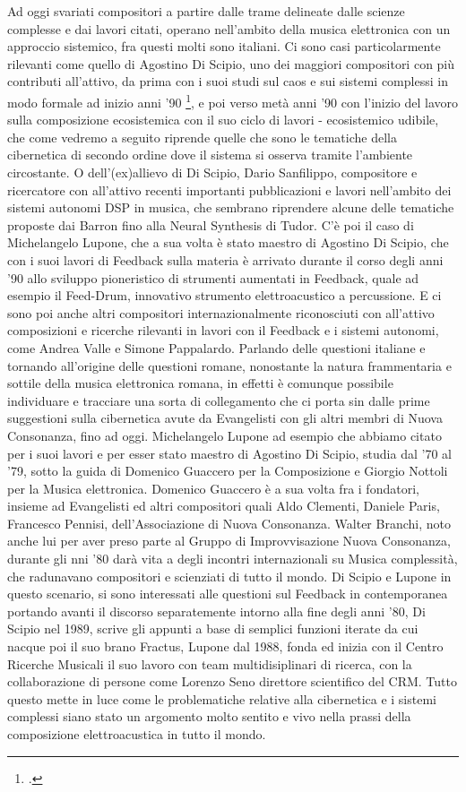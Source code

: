 Ad oggi svariati compositori a partire dalle trame delineate dalle scienze complesse e
dai lavori citati, operano nell'ambito della musica elettronica con un approccio sistemico,
fra questi molti sono italiani.
Ci sono casi particolarmente rilevanti come quello di Agostino Di Scipio,
uno dei maggiori compositori con più contributi all'attivo,
da prima con i suoi studi sul caos e sui sistemi complessi in modo formale ad inizio
anni '90 \footcite{discipioiterated},
e poi verso metà anni '90 con l'inizio del lavoro sulla composizione ecosistemica
con il suo ciclo di lavori
- ecosistemico udibile, che come vedremo a seguito riprende
quelle che sono le tematiche della cibernetica di secondo ordine dove
il sistema si osserva tramite l'ambiente circostante.
O dell'(ex)allievo di Di Scipio, Dario Sanfilippo,
compositore e ricercatore con all'attivo recenti importanti pubblicazioni e lavori
nell'ambito dei sistemi autonomi DSP in musica, che sembrano riprendere
alcune delle tematiche proposte dai Barron fino alla Neural Synthesis di Tudor.
C'è poi il caso di Michelangelo Lupone, che a sua volta è stato maestro
di Agostino Di Scipio,
che con i suoi lavori di Feedback sulla materia è arrivato durante il corso degli
anni '90 allo sviluppo
pioneristico di strumenti aumentati in Feedback, quale ad esempio il Feed-Drum,
innovativo strumento elettroacustico a percussione.
E ci sono poi anche altri compositori internazionalmente riconosciuti
con all'attivo composizioni e ricerche rilevanti in lavori con il Feedback
e i sistemi autonomi, come Andrea Valle e Simone Pappalardo.
Parlando delle questioni italiane e tornando all'origine delle questioni romane,
nonostante la natura frammentaria e sottile della musica elettronica romana,
in effetti è comunque possibile individuare e tracciare una sorta di collegamento
che ci porta sin dalle prime suggestioni sulla cibernetica avute da Evangelisti
con gli altri membri di Nuova Consonanza, fino ad oggi.
Michelangelo Lupone ad esempio che abbiamo citato per i suoi lavori
e per esser stato maestro di Agostino Di Scipio, studia dal ’70 al ’79,
sotto la guida di Domenico Guaccero per la Composizione
e Giorgio Nottoli per la Musica elettronica.
Domenico Guaccero è a sua volta fra i fondatori, insieme ad Evangelisti
ed altri compositori
quali Aldo Clementi, Daniele Paris, Francesco Pennisi,
dell'Associazione di Nuova Consonanza.
Walter Branchi, noto anche lui
per aver preso parte al Gruppo di Improvvisazione Nuova Consonanza,
durante gli nni '80 darà vita a degli incontri internazionali su
Musica complessità, che radunavano compositori e scienziati di
tutto il mondo.
Di Scipio e Lupone in questo scenario, si sono interessati alle questioni
sul Feedback in contemporanea
portando avanti il discorso separatemente intorno alla fine degli anni '80,
Di Scipio nel 1989, scrive gli appunti a base di semplici funzioni
iterate da cui nacque poi il suo brano Fractus,
Lupone dal 1988, fonda ed inizia con il Centro Ricerche Musicali il suo lavoro
con team multidisiplinari di ricerca,
con la collaborazione di persone come Lorenzo Seno direttore scientifico del CRM.
Tutto questo mette in luce come le problematiche relative alla cibernetica
e i sistemi complessi siano stato un argomento molto sentito e vivo
nella prassi della composizione elettroacustica in tutto il mondo.


